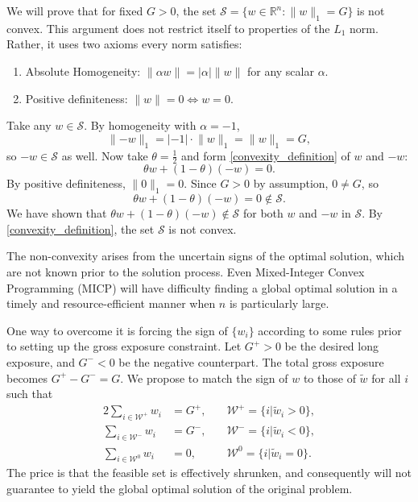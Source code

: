 \documentclass[11pt, letterpaper]{article}
\begin{document}
We will prove that for fixed $G > 0$, the set $\mathcal{S} = \{w\in \mathds{R}^n:\lVert w\rVert_1 = G\}$ is not convex.
This argument does not restrict itself to properties of the $L_1$ norm. Rather, it uses two axioms every norm satisfies:
\begin{enumerate}
	\item Absolute Homogeneity: $\lVert\alpha w\rVert = |\alpha| \lVert w\rVert$ for any scalar $\alpha$.
	\item Positive definiteness: $\lVert w\rVert = 0 \Leftrightarrow w = 0$.
\end{enumerate}
Take any $w \in \mathcal{S}$. By homogeneity with $\alpha = -1$,
\begin{equation*}
	\lVert-w\rVert_1 = | -1|\cdot \lVert w\rVert_1 = \lVert w\rVert_1 = G,
\end{equation*}
so $-w \in \mathcal{S}$ as well. Now take $\theta = \frac{1}{2}$ and form \eqref{convexity_definition} of $w$ and $-w$:
\begin{equation*}
	\theta w + (1-\theta)(-w) = 0.
\end{equation*}
By positive definiteness, $\lVert 0\rVert_1 = 0$. Since $G>0$ by assumption, $0 \neq G$, so
\begin{equation*}
	\theta w + (1-\theta)(-w) = 0 \notin \mathcal{S}.
\end{equation*}
We have shown that $\theta w + (1 - \theta) (-w) \notin \mathcal{S}$ for both $w$ and $-w$ in $\mathcal{S}$.
By \eqref{convexity_definition}, the set $\mathcal{S}$ is not convex.

The non-convexity arises from the uncertain signs of the optimal solution, which are not known prior to the solution
process. Even Mixed-Integer Convex Programming (MICP) will have difficulty finding a global optimal solution in a timely and
resource-efficient manner when $n$ is particularly large.

One way to overcome it is forcing the sign of $\{w_i\}$ according to some rules prior to setting up the gross exposure
constraint. Let $G^+ > 0$ be the desired long exposure, and $G^- < 0$ be the negative counterpart. The total gross exposure
becomes $G^+ - G^- = G$. We propose to match the sign of $w$ to those of $\tilde{w}$ for all $i$ such that
\begin{alignat*}{2}
	\sum_{i\in\mathcal{W}^+} {w_i} &= G^+,\quad & \mathcal{W}^+=\{i|\tilde{w}_i > 0\},\\
	\sum_{i\in\mathcal{W}^-} {w_i} &= G^-,\quad & \mathcal{W}^-=\{i|\tilde{w}_i < 0\},\\
	\sum_{i\in\mathcal{W}^0} {w_i} &= 0, & \mathcal{W}^0=\{i|\tilde{w}_i = 0\}.
\end{alignat*}
The price is that the feasible set is effectively shrunken, and consequently will not guarantee to yield the global optimal
solution of the original problem.
\end{document}
